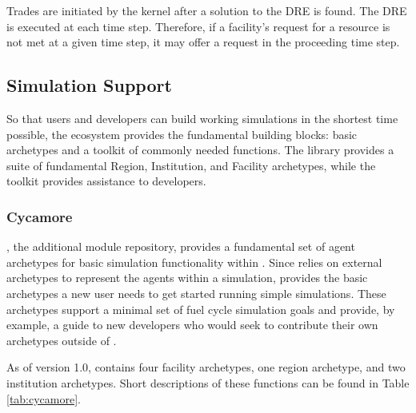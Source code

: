 Trades are initiated by the \Cyclus kernel after a solution to the \gls{DRE} is
found. The \gls{DRE} is executed at each time step. Therefore, if a facility's
request for a resource is not met at a given time step, it may offer a request
in the proceeding time step.

\subsection{Simulation Support}
So that users and developers can build working simulations
in the shortest time possible, the \Cyclus ecosystem provides the fundamental 
building blocks: basic archetypes and a toolkit of commonly needed functions.
The \Cycamore library provides a suite of fundamental Region, Institution, and 
Facility archetypes, while the \Cyclus toolkit provides assistance to 
developers.

\subsubsection{Cycamore}

\Cycamore \cite{carlsen_cycamore_2014}, the \Cyclus additional module
repository, provides a fundamental set of agent archetypes for basic simulation 
functionality within \Cyclus.  Since \Cyclus relies on external 
archetypes to represent the agents within a simulation, \Cycamore provides the 
basic archetypes a new user needs to get started running simple simulations.  
These archetypes support a minimal set of fuel cycle simulation goals and 
provide, by example, a guide to new developers who would seek to contribute 
their own archetypes outside of \Cycamore.

As of version 1.0, \Cycamore contains four facility archetypes, one region 
archetype, and two institution archetypes. Short descriptions of these 
functions can be found in Table \ref{tab:cycamore}.


